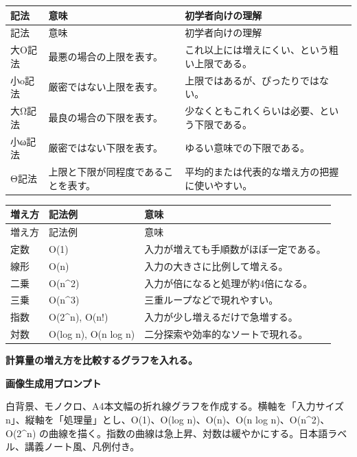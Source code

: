 \documentclass[a4paper,11pt]{ltjsarticle}
\begin{document}
\begin{longtable}{>{\raggedright\arraybackslash}p{}>{\raggedright\arraybackslash}p{}>{\raggedright\arraybackslash}p{}}
\toprule
記法 & 意味 & 初学者向けの理解 \\
\midrule
\endfirsthead
\toprule
記法 & 意味 & 初学者向けの理解 \\
\midrule
\endhead
大O記法 & 最悪の場合の上限を表す。 & これ以上には増えにくい、という粗い上限である。 \\
小o記法 & 厳密ではない上限を表す。 & 上限ではあるが、ぴったりではない。 \\
大Ω記法 & 最良の場合の下限を表す。 & 少なくともこれくらいは必要、という下限である。 \\
小ω記法 & 厳密ではない下限を表す。 & ゆるい意味での下限である。 \\
Θ記法 & 上限と下限が同程度であることを表す。 & 平均的または代表的な増え方の把握に使いやすい。 \\
\bottomrule
\end{longtable}

\begin{longtable}{>{\raggedright\arraybackslash}p{}>{\raggedright\arraybackslash}p{}>{\raggedright\arraybackslash}p{}}
\toprule
増え方 & 記法例 & 意味 \\
\midrule
\endfirsthead
\toprule
増え方 & 記法例 & 意味 \\
\midrule
\endhead
定数 & O(1) & 入力が増えても手順数がほぼ一定である。 \\
線形 & O(n) & 入力の大きさに比例して増える。 \\
二乗 & O(n\textasciicircum{}2) & 入力が倍になると処理が約4倍になる。 \\
三乗 & O(n\textasciicircum{}3) & 三重ループなどで現れやすい。 \\
指数 & O(2\textasciicircum{}n), O(n!) & 入力が少し増えるだけで急増する。 \\
対数 & O(log n), O(n log n) & 二分探索や効率的なソートで現れる。 \\
\bottomrule
\end{longtable}

\begin{todobox}
\textbf{計算量の増え方を比較するグラフを入れる。}\par
\textbf{画像生成用プロンプト}\par
白背景、モノクロ、A4本文幅の折れ線グラフを作成する。横軸を「入力サイズ n」、縦軸を「処理量」とし、O(1)、O(log n)、O(n)、O(n log n)、O(n\textasciicircum{}2)、O(2\textasciicircum{}n) の曲線を描く。指数の曲線は急上昇、対数は緩やかにする。日本語ラベル、講義ノート風、凡例付き。

\end{todobox}
\end{document}
